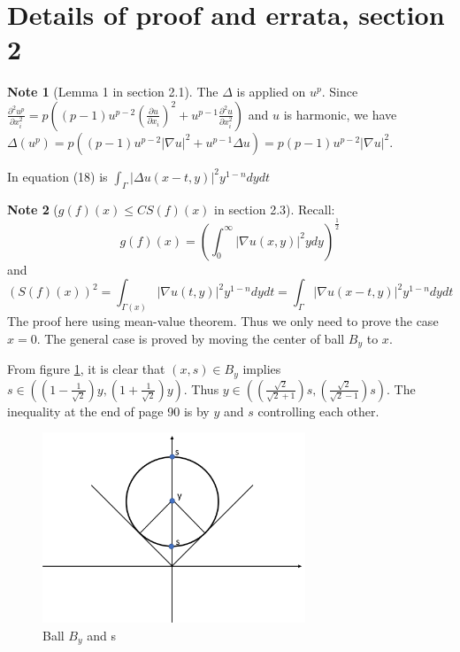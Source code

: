 \documentclass{report}
\theoremstyle{definition}
\newtheorem{note}{Note}
\theoremstyle{definition}
\theoremstyle{plain}
\numberwithin{theorem}{section}
\numberwithin{remark}{section}
\numberwithin{equation}{section}
\newcommand{\abs}[1]{\left\lvert#1\right\rvert}
\begin{document}
\section{Details of proof and errata, section 2}
\begin{note}[Lemma 1 in section 2.1]
    The $\Delta$ is applied on $u^p$. Since $\frac{\partial^2 u^p}{\partial x_i^2}=p((p-1)u^{p-2}(\frac{\partial u}{\partial x_i})^2+u^{p-1}\frac{\partial^2 u}{\partial x_i^2})$ and $u$ is harmonic, we have $\Delta(u^p)=p((p-1)u^{p-2}\abs{\nabla u}^2+u^{p-1}\Delta u)=p(p-1)u^{p-2}\abs{\nabla u}^2$.
\end{note}
\begin{errata}[P89]
In equation (18) is $\int_{\Gamma}{\abs{\Delta u(x-t,y)}^2 y^{1-n}d y d t}$
\end{errata}
\begin{note}[$g(f)(x)\leq CS(f)(x)$ in section 2.3]
    Recall:
    \begin{equation*}
        g(f)(x)=\left( \int_{0}^{\infty} \abs{\nabla u(x,y)}^2 y d y\right)^\frac{1}{2}
    \end{equation*}
    and
    \begin{equation*}
        (S(f)(x))^2=\int_{\Gamma(x)}{\abs{\nabla u(t,y)}^2 y^{1-n}dydt}=\int_{\Gamma}{\abs{\nabla u(x-t,y)}^2 y^{1-n}dydt}
    \end{equation*}
The proof here using mean-value theorem. Thus we only need to prove the case $x=0$. The general case is proved by moving the center of ball $B_y$ to $x$.\par
From figure \ref{fig1}, it is clear that $(x,s)\in B_y$ implies $s\in ((1-\frac{1}{\sqrt{2}})y,(1+\frac{1}{\sqrt{2}})y)$. Thus $y\in ((\frac{\sqrt{2}}{\sqrt{2}+1})s,(\frac{\sqrt{2}}{\sqrt{2}-1})s)$. The inequality at the end of page 90 is by $y$ and $s$ controlling each other.
\begin{figure}[h!]
    \centering
    \includegraphics[width = 0.7\textwidth]{Picture1.png}
    \caption{Ball $B_y$ and s}
    \label{fig1}
\end{figure}
\end{note}
\end{document}
